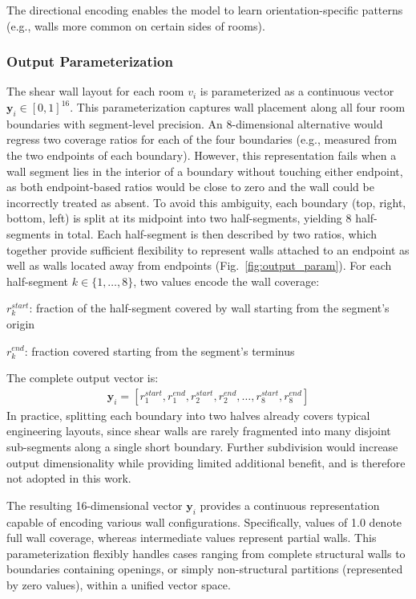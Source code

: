 The directional encoding enables the model to learn orientation-specific patterns (e.g., walls more common on certain sides of rooms).

\subsubsection{Output Parameterization}
\label{subsubsec:output_param}

The shear wall layout for each room $v_i$ is parameterized as a continuous vector $\mathbf{y}_i \in [0,1]^{16}$.
This parameterization captures wall placement along all four room boundaries with segment-level precision.
An 8-dimensional alternative would regress two coverage ratios for each of the four boundaries (e.g., measured from the two endpoints of each boundary).
However, this representation fails when a wall segment lies in the interior of a boundary without touching either endpoint, as both endpoint-based ratios would be close to zero and the wall could be incorrectly treated as absent.
To avoid this ambiguity, each boundary (top, right, bottom, left) is split at its midpoint into two half-segments, yielding 8 half-segments in total.
Each half-segment is then described by two ratios, which together provide sufficient flexibility to represent walls attached to an endpoint as well as walls located away from endpoints (Fig.~\ref{fig:output_param}).
For each half-segment $k \in \{1, \ldots, 8\}$, two values encode the wall coverage:

$r_k^{start}$: fraction of the half-segment covered by wall starting from the segment's origin

$r_k^{end}$: fraction covered starting from the segment's terminus

The complete output vector is:
\begin{align}
\mathbf{y}_i = [r_1^{start}, r_1^{end}, r_2^{start}, r_2^{end}, \ldots, r_8^{start}, r_8^{end}]
\end{align}
In practice, splitting each boundary into two halves already covers typical engineering layouts, since shear walls are rarely fragmented into many disjoint sub-segments along a single short boundary.
Further subdivision would increase output dimensionality while providing limited additional benefit, and is therefore not adopted in this work.

The resulting 16-dimensional vector $\mathbf{y}_i$ provides a continuous representation capable of encoding various wall configurations. Specifically, values of 1.0 denote full wall coverage, whereas intermediate values represent partial walls. This parameterization flexibly handles cases ranging from complete structural walls to boundaries containing openings, or simply non-structural partitions (represented by zero values), within a unified vector space.

